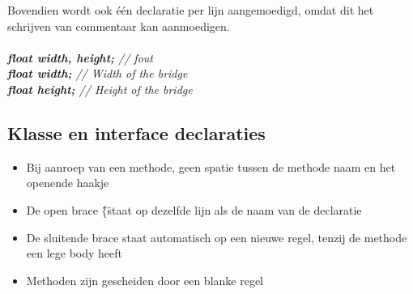 		Bovendien wordt ook één declaratie per lijn aangemoedigd, omdat dit het schrijven van commentaar kan aanmoedigen.
		\\ \\
		\emph{\textbf{float width, height;} // fout} \\
		\emph{\textbf{float width;} // Width of the bridge} \\
		\emph{\textbf{float height;} // Height of the bridge}
		

\subsection{Klasse en interface declaraties}
	\begin{itemize}
		\item{Bij aanroep van een methode, geen spatie tussen de methode naam en het openende haakje}
		\item{De open brace \"\{\" staat op dezelfde lijn als de naam van de declaratie}
		\item{De sluitende brace staat automatisch op een nieuwe regel, tenzij de methode een lege body heeft}
		\item{Methoden zijn gescheiden door een blanke regel}
	\end{itemize}
